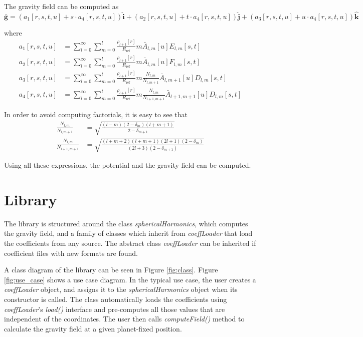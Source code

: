 \documentclass[]{AVSSimReportMemo}
\begin{document}
The gravity field can be computed as
\begin{equation}
\mathbf{\bar g} = (a_1[r,s,t,u] + s \cdot a_4[r,s,t,u]) \mathbf{\hat i} + (a_2[r,s,t,u] + t \cdot a_4[r,s,t,u]) \mathbf{\hat j} + (a_3[r,s,t,u] + u \cdot a_4[r,s,t,u]) \mathbf{\hat k}
\end{equation}

where
\begin{align}
a_1[r,s,t,u] &= \sum_{l=0}^\infty \sum_{m=0}^l \frac{\rho_{l+1}[r]}{R_{\text{ref}}} m \bar A_{l,m}[u] E_{l,m}[s,t]\\
a_2[r,s,t,u] &= \sum_{l=0}^\infty \sum_{m=0}^l \frac{\rho_{l+1}[r]}{R_{\text{ref}}} m \bar A_{l,m}[u] F_{l,m}[s,t]\\
a_3[r,s,t,u] &= \sum_{l=0}^\infty \sum_{m=0}^l \frac{\rho_{l+1}[r]}{R_{\text{ref}}} m \frac{N_{l,m}}{N_{l,m+1}} \bar A_{l,m+1}[u] D_{l,m}[s,t]\\
a_4[r,s,t,u] &= \sum_{l=0}^\infty \sum_{m=0}^l \frac{\rho_{l+1}[r]}{R_{\text{ref}}} m \frac{N_{l,m}}{N_{l+1,m+1}} \bar A_{l+1,m+1}[u] D_{l,m}[s,t]
\end{align}

In order to avoid computing factorials, it is easy to see that
\begin{align}
\frac{N_{l,m}}{N_{l,m+1}} &= \sqrt{\frac{(l-m) (2-\delta_m)(l+m+1)}{2- \delta_{m+1}}}\\
\frac{N_{l,m}}{N_{l+1,m+1}} &= \sqrt{\frac{(l+m+2)(l+m+1)(2l+1)(2-\delta_m)}{(2l+3)(2-\delta_{m+1})}}
\end{align}

Using all these expressions, the potential and the gravity field can be computed.

\clearpage

\section{Library}

The library is structured around the class \textit{sphericalHarmonics}, which computes the gravity field, and a family of classes which inherit from \textit{coeffLoader} that load the coefficients from any source. The abstract class \textit{coeffLoader} can be inherited if coefficient files with new formats are found.

A class diagram of the library can be seen in Figure \ref{fig:class}. Figure \ref{fig:use_case} shows a use case diagram. In the typical use case, the user creates a \textit{coeffLoader} object, and assigns it to the \textit{sphericalHarmonics} object when its constructor is called. The class automatically loads the coefficients using \textit{coeffLoader}'s \textit{load()} interface and pre-computes all those values that are independent of the coordinates. The user then calls \textit{computeField()} method to calculate the gravity field at a given planet-fixed position.
\end{document}
